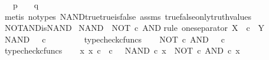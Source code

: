 \begin{isabellebody}
\ \ \ {\isachardoublequoteopen}{\isacharparenleft}{\kern0pt}p\ {\isacharequal}{\kern0pt}\ {\isasymf}{\isacharparenright}{\kern0pt}\ {\isasymor}\ {\isacharparenleft}{\kern0pt}q\ {\isacharequal}{\kern0pt}\ {\isasymf}{\isacharparenright}{\kern0pt}{\isachardoublequoteclose}\isanewline
%
\isadelimproof
\ \ %
\endisadelimproof
%
\isatagproof
{}\isamarkupfalse%
\ {\isacharparenleft}{\kern0pt}metis\ {\isacharparenleft}{\kern0pt}no{\isacharunderscore}{\kern0pt}types{\isacharparenright}{\kern0pt}\ NAND{\isacharunderscore}{\kern0pt}true{\isacharunderscore}{\kern0pt}true{\isacharunderscore}{\kern0pt}is{\isacharunderscore}{\kern0pt}false\ assms\ true{\isacharunderscore}{\kern0pt}false{\isacharunderscore}{\kern0pt}only{\isacharunderscore}{\kern0pt}truth{\isacharunderscore}{\kern0pt}values{\isacharparenright}{\kern0pt}%
\endisatagproof
{\isafoldproof}%
%
\isadelimproof
\isanewline
%
\endisadelimproof
\isanewline
{}\isamarkupfalse%
\ NOT{\isacharunderscore}{\kern0pt}AND{\isacharunderscore}{\kern0pt}is{\isacharunderscore}{\kern0pt}NAND{\isacharcolon}{\kern0pt}\isanewline
\ {\isachardoublequoteopen}NAND\ {\isacharequal}{\kern0pt}\ NOT\ {\isasymcirc}\isactrlsub c\ AND{\isachardoublequoteclose}\isanewline
%
\isadelimproof
%
\endisadelimproof
%
\isatagproof
{}\isamarkupfalse%
{\isacharparenleft}{\kern0pt}rule\ one{\isacharunderscore}{\kern0pt}separator{\isacharbrackleft}{\kern0pt}\ X\ {\isacharequal}{\kern0pt}\ {\isachardoublequoteopen}{\isasymOmega}{\isasymtimes}\isactrlsub c{\isasymOmega}{\isachardoublequoteclose}{\isacharcomma}{\kern0pt}\ \ Y\ {\isacharequal}{\kern0pt}\ {\isachardoublequoteopen}{\isasymOmega}{\isachardoublequoteclose}{\isacharbrackright}{\kern0pt}{\isacharparenright}{\kern0pt}\isanewline
\ \ \isamarkupfalse%
\ {\isachardoublequoteopen}NAND\ {\isacharcolon}{\kern0pt}\ {\isasymOmega}\ {\isasymtimes}\isactrlsub c\ {\isasymOmega}\ {\isasymrightarrow}\ {\isasymOmega}{\isachardoublequoteclose}\isanewline
\ \ \ \ \isamarkupfalse%
\ typecheck{\isacharunderscore}{\kern0pt}cfuncs\isanewline
\ \ \isamarkupfalse%
\ {\isachardoublequoteopen}NOT\ {\isasymcirc}\isactrlsub c\ AND\ {\isacharcolon}{\kern0pt}\ {\isasymOmega}\ {\isasymtimes}\isactrlsub c\ {\isasymOmega}\ {\isasymrightarrow}\ {\isasymOmega}{\isachardoublequoteclose}\isanewline
\ \ \ \ \isamarkupfalse%
\ typecheck{\isacharunderscore}{\kern0pt}cfuncs\isanewline
\ \ \isamarkupfalse%
\ {\isachardoublequoteopen}{\isasymAnd}x{\isachardot}{\kern0pt}\ x\ {\isasymin}\isactrlsub c\ {\isasymOmega}\ {\isasymtimes}\isactrlsub c\ {\isasymOmega}\ {\isasymLongrightarrow}\ NAND\ {\isasymcirc}\isactrlsub c\ x\ {\isacharequal}{\kern0pt}\ {\isacharparenleft}{\kern0pt}NOT\ {\isasymcirc}\isactrlsub c\ AND{\isacharparenright}{\kern0pt}\ {\isasymcirc}\isactrlsub c\ x{\isachardoublequoteclose}\isanewline

\end{isabellebody}
